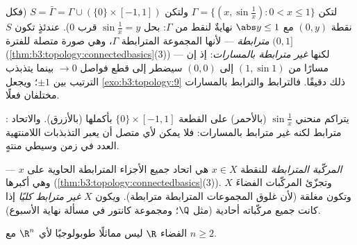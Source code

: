 \begin{example}
\label{ex:b3:topology:sinecurve}
لتكن $\Gamma = \{(x, \sin\frac1x) : 0 < x \leq 1\}$ ولتكن $S =
\bar\Gamma = \Gamma \cup (\{0\}\times[-1,1])$ (فكل نقطة $(0,
y)$ مع $\abs y \leq 1$
نهايةٌ لنقط من $\Gamma$: بحل $\sin\frac1x = y$ قرب $0$). عندئذٍ تكون $S$
\emph{مترابطة} --- لأنها  المجموعة المترابطة $\Gamma$، وهي
صورة متصلة للفترة $(0, 1]$ (\cref{thm:b3:topology:connectedbasics}(3)) --- لكنها
\emph{غير مترابطة بالمسارات}: إذ إن مسارًا من $(1, \sin 1)$ إلى
$(0,0)$ سيضطر إلى قطع فواصل $\to 0$ بينما يتذبذب الترتيب بين
$\pm1$؛ ويجعل \cref{exo:b3:topology:9} ذلك دقيقًا. فالترابط والترابط
بالمسارات مختلفان فعلًا.
\end{example}

\begin{omfigure}

{\small {}: يتراكم منحني $\sin\frac1x$
(بالأحمر) على القطعة $\{0\}\times[-1,1]$ بأكملها (بالأزرق). والاتحاد مترابط
لكنه غير مترابط بالمسارات: فلا يمكن لأي  متصل أن يعبر
التذبذبات اللامنتهية العدد في زمن وسيطي منتهٍ.}
\end{omfigure}

\begin{definition}\label{def:b3:topology:components}
\emph{المركّبة المترابطة} للنقطة $x
\in X$ هي
اتحاد جميع الأجزاء المترابطة الحاوية على $x$ --- وهي أكبرها
(\cref{thm:b3:topology:connectedbasics}(3)). وتجزّئ المركّبات الفضاءَ $X$ وتكون مغلقة (لأن
غلوق المجموعات المترابطة مترابطة). ويكون $X$ \emph{غير مترابط
كليًا} إذا كانت جميع مركّباته أحادية (مثل $\Q$؛ ومجموعة كانتور
في مسألة نهاية الأسبوع).
\end{definition}

\begin{theorem}\label{thm:b3:topology:rnotr2}
الفضاء $\R$ ليس مماثلًا طوبولوجيًا لأي $\R^n$ مع $n \geq 2$.
\end{theorem}

